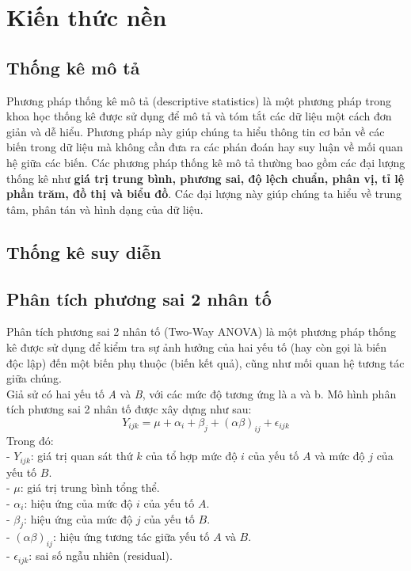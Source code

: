 \section{Kiến thức nền}\label{Kien thuc nen}
\subsection{Thống kê mô tả}
Phương pháp thống kê mô tả (descriptive statistics) là một phương pháp trong khoa học thống kê được sử dụng để mô tả và tóm tắt các dữ liệu một cách đơn giản và dễ hiểu. Phương pháp này giúp chúng ta hiểu thông tin cơ bản về các biến trong dữ liệu mà không cần đưa ra các phán đoán hay suy luận về mối quan hệ giữa các biến. Các phương pháp thống kê mô tả thường bao gồm các đại lượng thống kê như \textbf{giá trị trung bình, phương sai, độ lệch chuẩn, phân vị, tỉ lệ phần trăm, đồ thị và biểu đồ}. Các đại lượng này giúp chúng ta hiểu về trung tâm, phân tán và hình dạng của dữ liệu.
\subsection{Thống kê suy diễn}
\subsubsection{}
\subsection{Phân tích phương sai 2 nhân tố}
Phân tích phương sai 2 nhân tố (Two-Way ANOVA) là một phương pháp thống kê được sử dụng để kiểm tra sự ảnh hưởng của hai yếu tố (hay còn gọi là biến độc lập) đến một biến phụ thuộc (biến kết quả), cũng như mối quan hệ tương tác giữa chúng. \\
\indent  Giả sử có hai yếu tố \textit{A} và \textit{B}, với các mức độ tương ứng là a và b. Mô hình phân tích phương sai 2 nhân tố được xây dựng như sau:\\
\[
Y_{ijk} = \mu + \alpha_i + \beta_j + (\alpha \beta)_{ij} + \epsilon_{ijk}
\]
Trong đó:\\
- \( Y_{ijk} \): giá trị quan sát thứ \( k \) của tổ hợp mức độ \( i \) của yếu tố \( A \) và mức độ \( j \) của yếu tố \( B \).\\
- \( \mu \): giá trị trung bình tổng thể.\\
- \( \alpha_i \): hiệu ứng của mức độ \( i \) của yếu tố \( A \).\\
- \( \beta_j \): hiệu ứng của mức độ \( j \) của yếu tố \( B \).\\
- \( (\alpha\beta)_{ij} \): hiệu ứng tương tác giữa yếu tố \( A \) và \( B \).\\
- \( \epsilon_{ijk} \): sai số ngẫu nhiên (residual).\\
